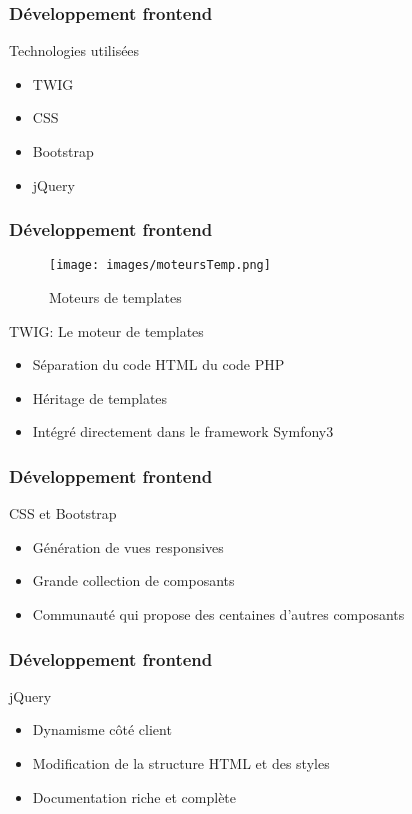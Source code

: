 \speaker{\Juliana}

\begin{frame}
\frametitle{Développement frontend}
\begin{block}{Technologies utilisées}
	\begin{itemize}
		\item TWIG
		\item CSS
		\item Bootstrap
		\item jQuery
	\end{itemize}
\end{block}
\end{frame}

\begin{frame}
\frametitle{Développement frontend}



      \begin{figure}[r]
		\texttt{[image: images/moteursTemp.png]}
		\caption{Moteurs de templates}
	  \end{figure}
\begin{block}{TWIG: Le moteur de templates }
	
		\begin{itemize}
			\item Séparation du code HTML du code PHP
			\item Héritage de templates
			\item Intégré directement dans le framework Symfony3
		\end{itemize}
\end{block}
\end{frame}

\begin{frame}
\frametitle{Développement frontend}
\begin{block}{ CSS et Bootstrap }
	\begin{itemize}
		\item Génération de vues responsives
		\item Grande collection de composants
		\item Communauté qui propose des centaines d'autres composants
	\end{itemize}
\end{block}
\end{frame}

\begin{frame}
\frametitle{Développement frontend}
\begin{block}{jQuery }
	\begin{itemize}
		\item Dynamisme côté client
		\item Modification de la structure HTML et des styles
		\item Documentation riche et complète
	\end{itemize}
\end{block}
\end{frame}

